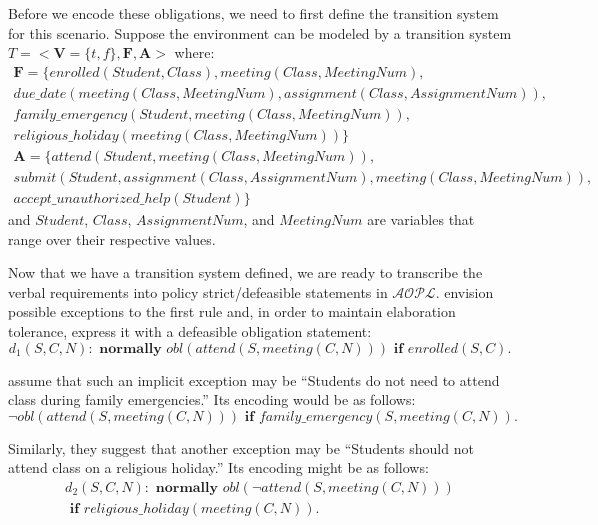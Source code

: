 Before we encode these obligations, we need to first define the transition system for this scenario.
Suppose the environment can be modeled by a transition system $T=<\boldsymbol{V}=\{t,f\}, \boldsymbol{F}, \boldsymbol{A}>$ where:
\begin{multline}
    \boldsymbol{F} = \{enrolled(Student, Class), meeting(Class, MeetingNum), \\
        due\_date(meeting(Class, MeetingNum), assignment(Class, AssignmentNum)), \\
        family\_emergency(Student, meeting(Class, MeetingNum)), \\
        religious\_holiday(meeting(Class, MeetingNum))\}
\end{multline}
\begin{multline}
    \boldsymbol{A} = \{attend(Student, meeting(Class, MeetingNum)), \\
        submit(Student, assignment(Class, AssignmentNum), meeting(Class, MeetingNum)), \\
        accept\_unauthorized\_help(Student)\}
\end{multline}
and $Student$, $Class$, $AssignmentNum$, and $MeetingNum$ are variables that range over their respective values.

Now that we have a transition system defined, we are ready to transcribe the verbal requirements into policy strict/defeasible statements in $\mathcal{AOPL}$.
\citet{gelfond_authorization_2008} envision possible exceptions to the first rule and, in order to maintain elaboration tolerance, express it with a defeasible obligation statement:
\begin{equation}
    \label{eq:aopl_example_line_1}
    d_1(S,C,N): \textbf{ normally } obl(attend(S, meeting(C, N))) \textbf{ if } enrolled(S, C).
\end{equation}

\citet{gelfond_authorization_2008} assume that such an implicit exception may be ``Students do not need to attend class during family emergencies.''
Its encoding would be as follows:
\begin{equation}
    \label{eq:aopl_example_line_2}
    \neg obl(attend(S,meeting(C, N))) \textbf{ if } family\_emergency(S,meeting(C, N)).
\end{equation}

Similarly, they suggest that another exception may be ``Students should not attend class on a religious holiday.''
Its encoding might be as follows:
\begin{multline}
    \label{eq:aopl_example_line_3}
    d_2(S,C,N): \textbf{ normally } obl(\neg attend(S, meeting(C, N))) \\
        \textbf{ if } religious\_holiday(meeting(C, N)).
\end{multline}

